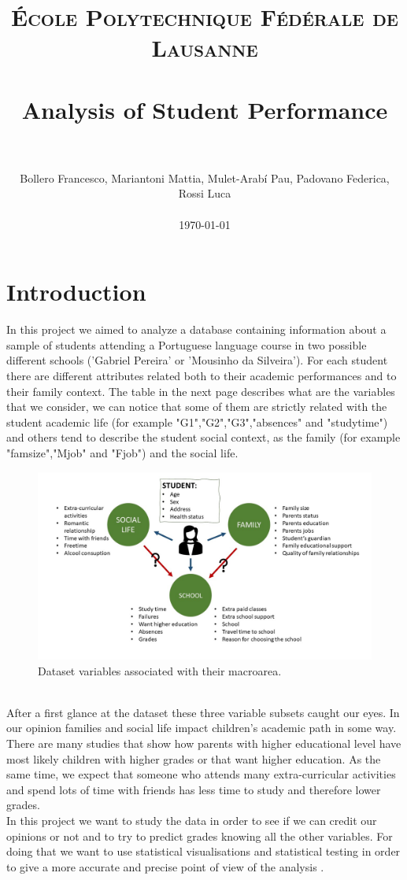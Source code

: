 \documentclass[a4paper, 11pt]{article}
\title{
		\usefont{OT1}{bch}{b}{n}
		\normalfont \normalsize \textsc{École Polytechnique Fédérale de Lausanne} \\ [25pt]
		\horrule{0.5pt} \\[0.4cm]
		\huge Analysis of Student Performance \\
		\horrule{2pt} \\[0.5cm]
}
\author{
		\normalfont 								\normalsize
        Bollero Francesco, Mariantoni Mattia, Mulet-Arabí Pau, Padovano Federica, Rossi Luca\\\\[-3pt]		\normalsize
        \today
}
\date{}
\theoremstyle{definition}
\numberwithin{equation}{section}		%
\numberwithin{table}{section}				%
\begin{document}
\maketitle
\newpage
\tableofcontents
\newpage
\section{Introduction}
In this project we aimed to analyze a database containing information about a sample of students attending a Portuguese language course in two possible different schools ('Gabriel Pereira' or 'Mousinho da Silveira'). For each student there are different attributes related both to their academic performances and to their family context. The table in the next page describes what are the variables that we consider, we can notice that some of them are strictly related with the student academic life (for example "G1","G2","G3","absences" and "studytime") and others tend to describe the student social context, as the family (for example "famsize","Mjob" and "Fjob") and the social life.
 
\begin{figure}[h]\centering
\includegraphics[scale=0.4]{variables.jpg}
\caption{Dataset variables associated with their macroarea.}
\end{figure}

\\After a first glance at the dataset these three variable subsets caught our eyes. In our opinion families and social life impact children's academic path in some way. There are many studies that show how parents with higher educational level have most likely children with higher grades or that want higher education. As the same time, we expect that someone who attends many extra-curricular activities and spend lots of time with friends has less time to study and therefore lower grades. 
\\In this project we want to study the data in order to see if we can credit our opinions or not and to try to predict grades knowing all the other variables. For doing that we want to use statistical visualisations and statistical testing in order to give a more accurate and precise point of view of the analysis .
\end{document}
